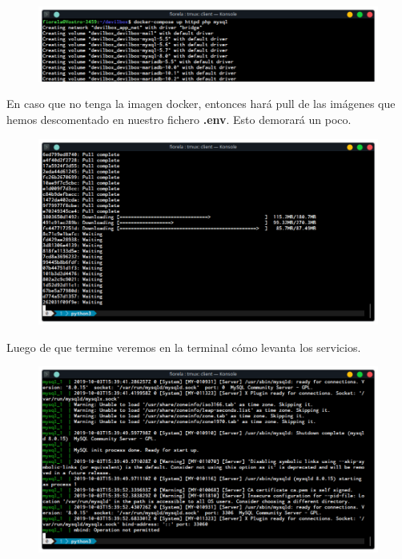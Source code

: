 \documentclass{article}
\begin{document}
\begin{figure}[h!]
  \centering
  \includegraphics[scale=0.65]{./Pictures/Devilbox/014_compose_up.png}
\end{figure}

En caso que no tenga la imagen docker, entonces hará pull de las imágenes que
hemos descomentado en nuestro fichero \textbf{.env}. Esto demorará un poco.\\

\newpage

\begin{figure}[h!]
  \centering
  \includegraphics[scale=0.65]{./Pictures/Devilbox/015_compose_dowloads.png}
\end{figure}

Luego de que termine veremos en la terminal cómo levanta los servicios.

\begin{figure}[h!]
  \centering
  \includegraphics[scale=0.65]{./Pictures/Devilbox/016_compose_finish.png}
\end{figure}
\end{document}
